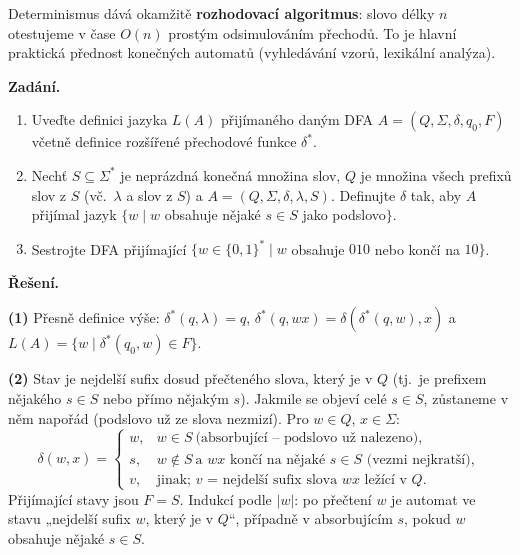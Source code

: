 \documentclass[11pt,a4paper]{article}
\begin{document}
\begin{poznamka}
Determinismus dává okamžitě \textbf{rozhodovací algoritmus}: slovo délky $n$ otestujeme v čase $O(n)$ prostým odsimulováním přechodů. To je hlavní praktická přednost konečných automatů (vyhledávání vzorů, lexikální analýza).
\end{poznamka}

\begin{priklad}
\par
\textbf{Zadání.}\par
\begin{enumerate}
  \item Uveďte definici jazyka $L(A)$ přijímaného daným DFA $A=(Q,\Sigma,\delta,q_0,F)$ včetně definice rozšířené přechodové funkce $\delta^*$.
  \item Nechť $S\subseteq\Sigma^*$ je neprázdná konečná množina slov, $Q$ je množina všech prefixů slov z $S$ (vč.\ $\lambda$ a slov z $S$) a $A=(Q,\Sigma,\delta,\lambda,S)$. Definujte $\delta$ tak, aby $A$ přijímal jazyk $\{w\mid w$ obsahuje nějaké $s\in S$ jako podslovo$\}$.
  \item Sestrojte DFA přijímající $\{w\in\{0,1\}^*\mid w$ obsahuje $010$ nebo končí na $10\}$.
\end{enumerate}

\smallskip
\textbf{Řešení.}\par
\textbf{(1)} Přesně definice výše: $\delta^*(q,\lambda)=q$, $\delta^*(q,wx)=\delta(\delta^*(q,w),x)$ a $L(A)=\{w\mid\delta^*(q_0,w)\in F\}$.

\textbf{(2)} Stav je nejdelší sufix dosud přečteného slova, který je v $Q$ (tj.\ je prefixem nějakého $s\in S$ nebo přímo nějakým $s$). Jakmile se objeví celé $s\in S$, zůstaneme v něm napořád (podslovo už ze slova nezmizí). Pro $w\in Q$, $x\in\Sigma$:
\[ \delta(w,x)=\begin{cases}
  w, & w\in S\ \text{(absorbující -- podslovo už nalezeno)},\\
  s, & w\notin S\ \text{a $wx$ končí na nějaké $s\in S$ (vezmi nejkratší)},\\
  v, & \text{jinak; $v$ = nejdelší sufix slova $wx$ ležící v $Q$.}
\end{cases} \]
Přijímající stavy jsou $F=S$. Indukcí podle $|w|$: po přečtení $w$ je automat ve stavu „nejdelší sufix $w$, který je v $Q$``, případně v absorbujícím $s$, pokud $w$ obsahuje nějaké $s\in S$.


\end{priklad}
\end{document}
